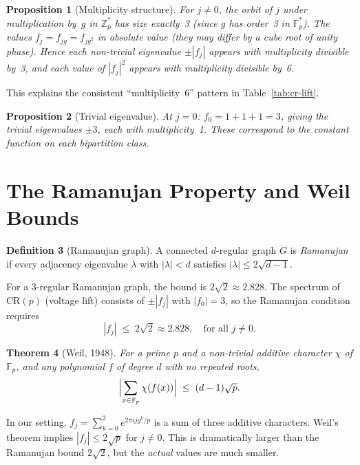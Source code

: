 \documentclass[11pt,a4paper]{article}
\theoremstyle{plain}
\newtheorem{theorem}{Theorem}
\newtheorem{proposition}[theorem]{Proposition}
\theoremstyle{definition}
\newtheorem{definition}[theorem]{Definition}
\theoremstyle{remark}
\newcommand{\Z}{\mathbb{Z}}
\newcommand{\F}{\mathbb{F}}
\newcommand{\CR}{\mathrm{CR}}
\begin{document}
\begin{proposition}[Multiplicity structure]
\label{prop:mult}
For $j \neq 0$, the orbit of $j$ under multiplication by~$g$ in $\Z_p^*$ has
size exactly~3 (since $g$ has order~3 in $\F_p^*$). The values
$f_j = f_{jg} = f_{jg^2}$ in absolute value (they may differ by a cube root
of unity phase). Hence each non-trivial eigenvalue $\pm|f_j|$ appears with
multiplicity divisible by~3, and each value of $|f_j|^2$ appears with
multiplicity divisible by~6.
\end{proposition}

This explains the consistent ``multiplicity~6'' pattern in Table~\ref{tab:cr-lift}.

\begin{proposition}[Trivial eigenvalue]
At $j = 0$: $f_0 = 1 + 1 + 1 = 3$, giving the trivial eigenvalues $\pm 3$,
each with multiplicity~1. These correspond to the constant function on each
bipartition class.
\end{proposition}


\section{The Ramanujan Property and Weil Bounds}
\label{sec:ramanujan}

\begin{definition}[Ramanujan graph]
A connected $d$-regular graph $G$ is \emph{Ramanujan} if every adjacency
eigenvalue $\lambda$ with $|\lambda| < d$ satisfies
$|\lambda| \le 2\sqrt{d-1}$.
\end{definition}

For a 3-regular Ramanujan graph, the bound is $2\sqrt{2} \approx 2.828$.
The spectrum of $\CR(p)$ (voltage lift) consists of $\pm |f_j|$ with
$|f_0| = 3$, so the Ramanujan condition requires
\[
  |f_j| \;\le\; 2\sqrt{2} \approx 2.828, \quad \text{for all } j \neq 0.
\]

\begin{theorem}[Weil, 1948]
\label{thm:weil}
For a prime $p$ and a non-trivial additive character $\chi$ of $\F_p$,
and any polynomial $f$ of degree $d$ with no repeated roots,
\[
  \Bigl|\sum_{x \in \F_p} \chi(f(x))\Bigr| \;\le\; (d-1)\sqrt{p}.
\]
\end{theorem}

In our setting, $f_j = \sum_{k=0}^{2} e^{2\pi i jg^k/p}$ is a sum of three
additive characters. Weil's theorem implies $|f_j| \le 2\sqrt{p}$ for $j \neq 0$.
This is dramatically larger than the Ramanujan bound $2\sqrt{2}$, but
the \emph{actual} values are much smaller.
\end{document}
